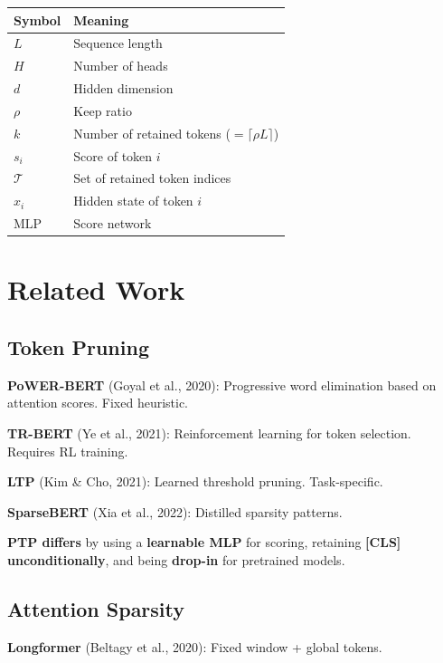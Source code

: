 {\begin{table}[H]
\centering
\small
\begin{tabular}{ll}
\toprule
\textbf{Symbol} & \textbf{Meaning} \\
\midrule
$L$ & Sequence length \\
$H$ & Number of heads \\
$d$ & Hidden dimension \\
$\rho$ & Keep ratio \\
$k$ & Number of retained tokens ($= \lceil \rho L \rceil$) \\
$s_i$ & Score of token $i$ \\
$\mathcal{T}$ & Set of retained token indices \\
$x_i$ & Hidden state of token $i$ \\
$\text{MLP}$ & Score network \\
\bottomrule
\end{tabular}
\end{table}




\section{Related Work}

\subsection{Token Pruning}

\textbf{PoWER-BERT} (Goyal et al., 2020): Progressive word elimination based on 
attention scores. Fixed heuristic.

\textbf{TR-BERT} (Ye et al., 2021): Reinforcement learning for token selection. 
Requires RL training.

\textbf{LTP} (Kim \& Cho, 2021): Learned threshold pruning. Task-specific.

\textbf{SparseBERT} (Xia et al., 2022): Distilled sparsity patterns.

\textbf{PTP differs} by using a \textbf{learnable MLP} for scoring, retaining 
\textbf{[CLS] unconditionally}, and being \textbf{drop-in} for pretrained models.

\subsection{Attention Sparsity}

\textbf{Longformer} (Beltagy et al., 2020): Fixed window + global tokens.

}
